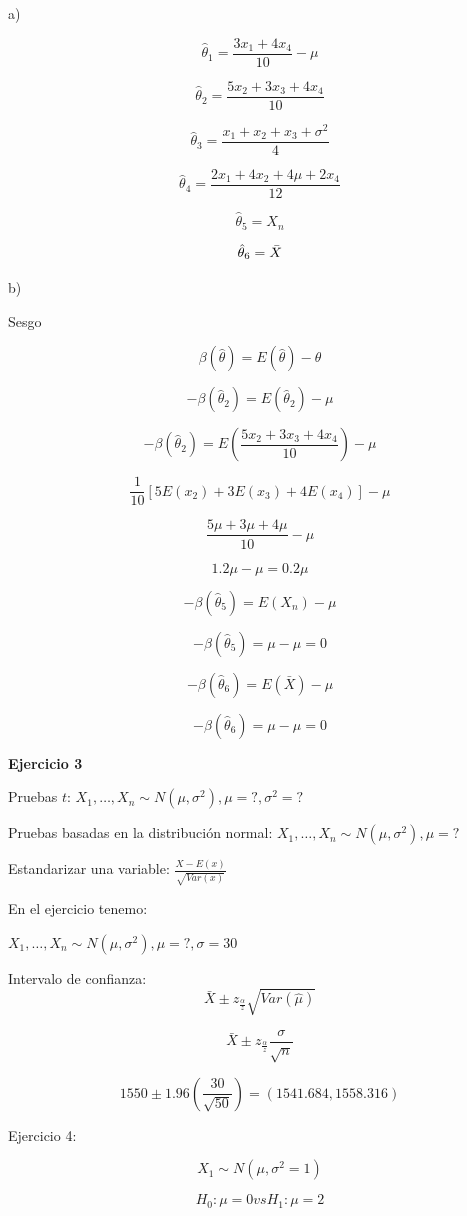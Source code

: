 \documentclass{article}
\begin{document}
a)

\[\hat{\theta}_1 = \frac{3x_1 + 4x_4}{10} - \mu\]

\[\hat{\theta}_2 = \frac{5x_2 + 3x_3 +4x_4}{10}\]

\[\hat{\theta}_3 = \frac{x_1 + x_2 + x_3 + \sigma^2}{4}\]

\[\hat{\theta}_4 = \frac{2x_1 + 4x_2 + 4\mu + 2x_4}{12}\]

\[\hat{\theta}_5 = X_n\]

\[\hat{\theta}_6 = \Bar{X}\]

b)

Sesgo

\[\beta(\hat{\theta}) = E(\hat{\theta}) - \theta\]

\[- \beta(\hat{\theta}_2) = E(\hat{\theta}_2) - \mu\]

\[- \beta(\hat{\theta}_2) = E(\frac{5x_2 + 3x_3 + 4x_4}{10}) - \mu\]

\[\frac{1}{10} [5E(x_2) + 3E(x_3) + 4E(x_4)] - \mu\]

\[\frac{5\mu + 3 \mu + 4\mu}{10} - \mu\]

\[1.2\mu - \mu = 0.2\mu\]

\[- \beta(\hat{\theta}_5) = E(X_n) - \mu\]

\[- \beta(\hat{\theta}_5) = \mu - \mu = 0\]

\[- \beta(\hat{\theta}_6) = E(\bar{X}) - \mu\]

\[- \beta(\hat{\theta}_6) = \mu - \mu = 0\]

\textbf{Ejercicio 3}

Pruebas $t$: $X_1, \dots, X_n \sim N(\mu, \sigma^2), \mu = ?, \sigma^2 = ?$

Pruebas basadas en la distribución normal: $X_1, \dots, X_n \sim N(\mu, \sigma^2), \mu = ?$

Estandarizar una variable: $\frac{X - E(x)}{\sqrt{Var(x)}}$

En el ejercicio tenemo:

$X_1, \dots, X_n \sim N(\mu, \sigma^2), \mu = ?, \sigma = 30$

Intervalo de confianza:
\[\bar{X} \pm z_{\frac{\alpha}{z}} \sqrt{Var(\hat{\mu})}\]

\[\bar{X} \pm z_{\frac{\alpha}{z}} \frac{\sigma}{\sqrt{n}}\]

\[1550 \pm 1.96 \left(\frac{30}{\sqrt{50}}\right) = (1541.684, 1558.316)\]

Ejercicio 4:

\[X_1 \sim N(\mu, \sigma^2 = 1)\]

\[H_0: \mu = 0 vs H_1: \mu = 2\]
\end{document}
